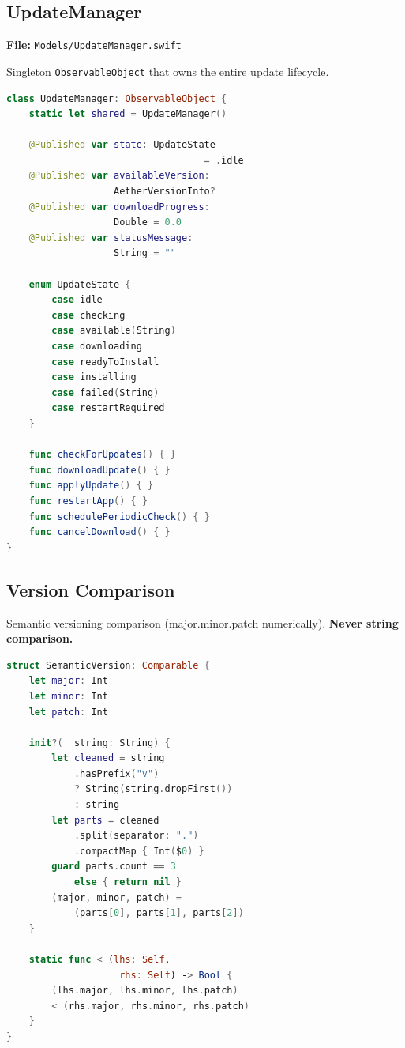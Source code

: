 \documentclass[11pt, a4paper]{article}
\begin{document}
\subsection{UpdateManager}

\textbf{File:} \texttt{Models/UpdateManager.swift}

Singleton \texttt{ObservableObject} that owns the entire update lifecycle.

\begin{lstlisting}[language=swift]
class UpdateManager: ObservableObject {
    static let shared = UpdateManager()

    @Published var state: UpdateState
                                   = .idle
    @Published var availableVersion:
                   AetherVersionInfo?
    @Published var downloadProgress:
                   Double = 0.0
    @Published var statusMessage:
                   String = ""

    enum UpdateState {
        case idle
        case checking
        case available(String)
        case downloading
        case readyToInstall
        case installing
        case failed(String)
        case restartRequired
    }

    func checkForUpdates() { }
    func downloadUpdate() { }
    func applyUpdate() { }
    func restartApp() { }
    func schedulePeriodicCheck() { }
    func cancelDownload() { }
}
\end{lstlisting}

\subsection{Version Comparison}

Semantic versioning comparison (major.minor.patch numerically). \textbf{Never string comparison.}

\begin{lstlisting}[language=swift]
struct SemanticVersion: Comparable {
    let major: Int
    let minor: Int
    let patch: Int

    init?(_ string: String) {
        let cleaned = string
            .hasPrefix("v")
            ? String(string.dropFirst())
            : string
        let parts = cleaned
            .split(separator: ".")
            .compactMap { Int($0) }
        guard parts.count == 3
            else { return nil }
        (major, minor, patch) =
            (parts[0], parts[1], parts[2])
    }

    static func < (lhs: Self,
                    rhs: Self) -> Bool {
        (lhs.major, lhs.minor, lhs.patch)
        < (rhs.major, rhs.minor, rhs.patch)
    }
}
\end{lstlisting}
\end{document}
